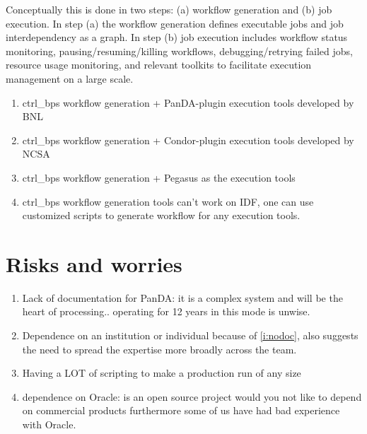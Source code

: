 Conceptually this is done in two steps: (a) workflow generation and (b) job execution.
In step (a) the workflow generation defines executable jobs and job interdependency as a graph.
In step (b) job execution includes workflow status monitoring, pausing/resuming/killing workflows, debugging/retrying failed jobs, resource usage monitoring, and relevant toolkits to facilitate execution management on a large scale.
\begin{enumerate}
\item  ctrl\_bps workflow generation + PanDA-plugin execution tools developed by BNL
\item ctrl\_bps workflow generation + Condor-plugin execution tools developed by NCSA
\item ctrl\_bps workflow generation + Pegasus as the execution tools
\item ctrl\_bps workflow generation tools can't work on IDF, one can use customized scripts to generate workflow for any execution tools.
\end{enumerate}



\section {Risks and worries}

\begin{enumerate}
\item Lack of documentation for PanDA: it is a complex system and will
  be the heart of processing.. operating for 12 years in this mode is unwise.\label{i:nodoc}
\item Dependence on an institution or individual because of
  \ref{i:nodoc}, also suggests the need to spread the expertise more
  broadly across the team.
\item Having a LOT of scripting to make a production run of any size
\item dependence on Oracle: is an open source project would you not like to depend on commercial products furthermore some of us have had bad experience with Oracle.
\end{enumerate}
